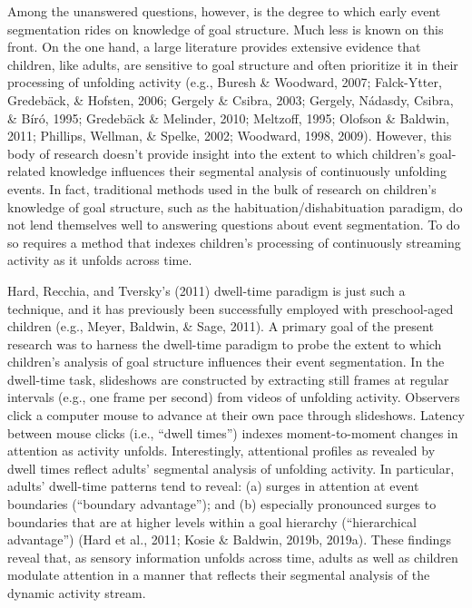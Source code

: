 \documentclass[
  english,
  man,floatsintext]{apa6}
\begin{document}
Among the unanswered questions, however, is the degree to which early event segmentation rides on knowledge of goal structure. Much less is known on this front. On the one hand, a large literature provides extensive evidence that children, like adults, are sensitive to goal structure and often prioritize it in their processing of unfolding activity (e.g., Buresh \& Woodward, 2007; Falck-Ytter, Gredebäck, \& Hofsten, 2006; Gergely \& Csibra, 2003; Gergely, Nádasdy, Csibra, \& Bíró, 1995; Gredebäck \& Melinder, 2010; Meltzoff, 1995; Olofson \& Baldwin, 2011; Phillips, Wellman, \& Spelke, 2002; Woodward, 1998, 2009). However, this body of research doesn't provide insight into the extent to which children's goal-related knowledge influences their segmental analysis of continuously unfolding events. In fact, traditional methods used in the bulk of research on children's knowledge of goal structure, such as the habituation/dishabituation paradigm, do not lend themselves well to answering questions about event segmentation. To do so requires a method that indexes children's processing of continuously streaming activity as it unfolds across time.

Hard, Recchia, and Tversky's (2011) dwell-time paradigm is just such a technique, and it has previously been successfully employed with preschool-aged children (e.g., Meyer, Baldwin, \& Sage, 2011). A primary goal of the present research was to harness the dwell-time paradigm to probe the extent to which children's analysis of goal structure influences their event segmentation. In the dwell-time task, slideshows are constructed by extracting still frames at regular intervals (e.g., one frame per second) from videos of unfolding activity. Observers click a computer mouse to advance at their own pace through slideshows. Latency between mouse clicks (i.e., ``dwell times'') indexes moment-to-moment changes in attention as activity unfolds. Interestingly, attentional profiles as revealed by dwell times reflect adults' segmental analysis of unfolding activity. In particular, adults' dwell-time patterns tend to reveal: (a) surges in attention at event boundaries (``boundary advantage''); and (b) especially pronounced surges to boundaries that are at higher levels within a goal hierarchy (``hierarchical advantage'') (Hard et al., 2011; Kosie \& Baldwin, 2019b, 2019a). These findings reveal that, as sensory information unfolds across time, adults as well as children modulate attention in a manner that reflects their segmental analysis of the dynamic activity stream.
\end{document}
